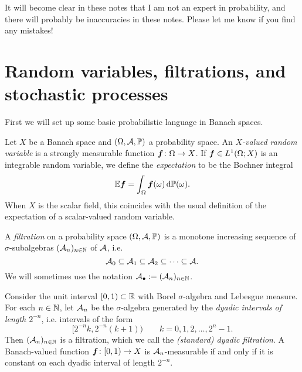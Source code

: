 \begin{rmk}
  It will become clear in these notes that I am not an expert in probability, and there will probably be inaccuracies in these notes.
  Please let me know if you find any mistakes!
\end{rmk}

\section{Random variables, filtrations, and stochastic processes}

First we will set up some basic probabilistic language in Banach spaces.

\begin{defn}\label{defn:RV}
  Let $X$ be a Banach space and $(\Omega,\mathcal{A},\mathbb{P})$ a probability space.
  An \emph{$X$-valued random variable} is a strongly measurable function $\bm{f} \colon \Omega \rightarrow X$.
  If $\bm{f} \in L^1(\Omega;X)$ is an integrable random variable, we define the \emph{expectation} to be the Bochner integral
  \begin{equation*}
    \mathbb{E} \bm{f} = \int_{\Omega} \bm{f}(\omega) \, \mathrm{d}\mathbb{P}(\omega).
  \end{equation*}
  When $X$ is the scalar field, this coincides with the usual definition of the expectation of a scalar-valued random variable.
\end{defn}

\begin{defn}
  A \emph{filtration} on a probability space $(\Omega,\mathcal{A},\mathbb{P})$ is a monotone increasing sequence of $\sigma$-subalgebras $(\mathcal{A}_{n})_{n \in \mathbb{N}}$ of $\mathcal{A}$, i.e.
  \begin{equation*}
    \mathcal{A}_0 \subseteq \mathcal{A}_1 \subseteq \mathcal{A}_2 \subseteq \cdots \subseteq \mathcal{A}. 
  \end{equation*}
  We will sometimes use the notation $\mathcal{A}_{\bullet} := (\mathcal{A}_{n})_{n \in \mathbb{N}}$.
\end{defn}

\begin{example}\label{eg:dyadic-filtration}
  Consider the unit interval $[0,1) \subset \mathbb{R}$ with Borel $\sigma$-algebra and Lebesgue measure.
  For each $n \in \mathbb{N}$, let $\mathcal{A}_n$ be the $\sigma$-algebra generated by the \emph{dyadic intervals of length $2^{-n}$}, i.e. intervals of the form
  \begin{equation*}
    [2^{-n}k, 2^{-n}(k+1)) \qquad k = 0, 1, 2, \ldots, 2^{n}- 1.
  \end{equation*}
  Then $(\mathcal{A}_n)_{n \in \mathbb{N}}$ is a filtration, which we call the \emph{(standard) dyadic filtration}.
  A Banach-valued function $\bm{f} \colon [0,1) \rightarrow X$ is $\mathcal{A}_n$-measurable if and only if it is constant on each dyadic interval of length $2^{-n}$.  
\end{example}

